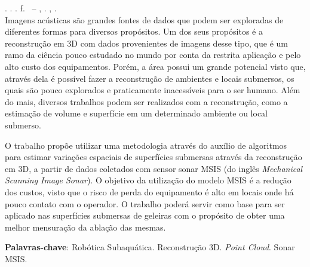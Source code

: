 
\begin{resumo}[RESUMO]
\begin{SingleSpacing}

\imprimirautorcitacao. \imprimirtitulo. \imprimirdata. \pageref {LastPage} f. \imprimirprojeto\ – \imprimirprograma, \imprimirinstituicao. \imprimirlocal, \imprimirdata.\\

Imagens acústicas são grandes fontes de dados que podem ser exploradas de diferentes formas para diversos propósitos.
Um dos seus propósitos é a reconstrução em 3D com dados provenientes de imagens desse tipo, que é um ramo da ciência pouco estudado no mundo por conta da restrita aplicação e pelo alto custo dos equipamentos.
Porém, a área possui um grande potencial visto que, através dela é possível fazer a reconstrução de ambientes e locais submersos, os quais são pouco explorados e praticamente inacessíveis para o ser humano.
Além do mais, diversos trabalhos podem ser realizados com a reconstrução, como a estimação de volume e superfície em um determinado ambiente ou local submerso.

O trabalho propõe utilizar uma metodologia através do auxílio de algoritmos para estimar variações espaciais de superfícies submersas através da  reconstrução em 3D, a partir de dados coletados com sensor sonar MSIS (do inglês \textit{Mechanical Scanning Image Sonar}). 
O objetivo da utilização do modelo MSIS é a redução dos custos, visto que o risco de perda do equipamento é alto em locais onde há pouco contato com o operador.
O trabalho poderá servir como base para ser aplicado nas superfícies submersas de geleiras com o propósito de obter uma melhor mensuração da ablação das mesmas.


\vspace{2em}
\textbf{Palavras-chave}: Robótica Subaquática. Reconstrução 3D. \textit{Point Cloud}. Sonar MSIS.

\end{SingleSpacing}
\end{resumo}

